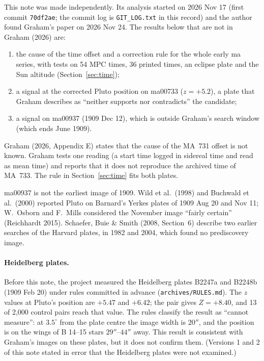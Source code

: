 \documentclass[11pt]{article}
\begin{document}
This note was made independently. Its analysis started on 2026 Nov 17 (first commit \texttt{70df2ae}; the commit log is \texttt{GIT\_LOG.txt} in this record) and the author found Graham's paper on 2026 Nov 24. The results below that are not in Graham (2026) are:
\begin{enumerate}
\item the cause of the time offset and a correction rule for the whole early ma series, with tests on 54 MPC times, 36 printed times, an eclipse plate and the Sun altitude (Section~\ref{sec:time});
\item a signal at the corrected Pluto position on ma00733 ($z=+5.2$), a plate that Graham describes as ``neither supports nor contradicts'' the candidate;
\item a signal on ma00937 (1909 Dec 12), which is outside Graham's search window (which ends June 1909).
\end{enumerate}
Graham (2026, Appendix E) states that the cause of the MA~731 offset is not known. Graham tests one reading (a start time logged in sidereal time and read as mean time) and reports that it does not reproduce the archived time of MA~733. The rule in Section~\ref{sec:time} fits both plates.

ma00937 is not the earliest image of 1909. Wild et al.\ (1998) and Buchwald et al.\ (2000) reported Pluto on Barnard's Yerkes plates of 1909 Aug 20 and Nov 11; W.~Osborn and F.~Mills considered the November image ``fairly certain'' (Reichhardt 2015). Schaefer, Buie \& Smith (2008, Section~6) describe two earlier searches of the Harvard plates, in 1982 and 2004, which found no prediscovery image.

\paragraph{Heidelberg plates.} Before this note, the project measured the Heidelberg plates B2247a and B2248b (1909 Feb 20) under rules committed in advance (\texttt{archives/RULES.md}). The $z$ values at Pluto's position are $+5.47$ and $+6.42$; the pair gives $Z=+8.40$, and 13 of 2{,}000 control pairs reach that value. The rules classify the result as ``cannot measure'': at $3.5^\circ$ from the plate centre the image width is $20''$, and the position is on the wings of B 14--15 stars $29''$--$44''$ away. This result is consistent with Graham's images on these plates, but it does not confirm them. (Versions 1 and 2 of this note stated in error that the Heidelberg plates were not examined.)
\end{document}
